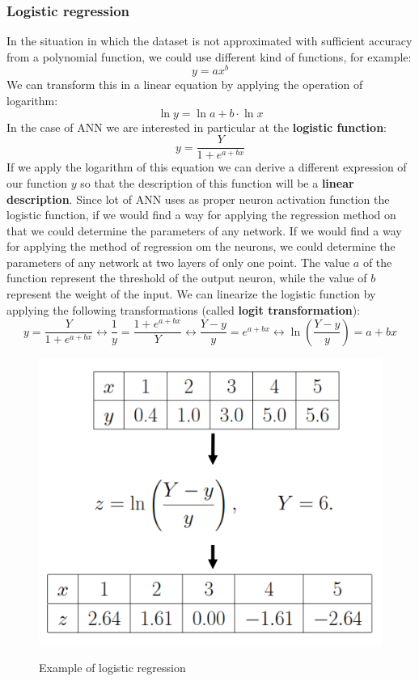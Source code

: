 \documentclass{article}
\begin{document}
\subsubsection{Logistic regression}
In the situation in which the dataset is not approximated with sufficient accuracy
from a polynomial function, we could use different kind of functions, for example:
$$y=ax^b$$
We can transform this in a linear equation by applying the operation of logarithm:
$$\ln{y}=\ln{a}+b\cdot\ln{x}$$
In the case of ANN we are interested in particular at the \textbf{logistic function}:
$$y=\frac{Y}{1 + e^{a+bx}}$$
If we apply the logarithm of this equation we can derive a different expression of our
function $y$ so that the description of this function will be a \textbf{linear description}.
\newline\newline
Since lot of ANN uses as proper neuron activation function the logistic function,
if we would find a way for applying the regression method on that we could determine
the parameters of any network.
\newline\newline
If we would find a way for applying the method of regression om the neurons, we could
determine the parameters of any network at two layers of only one point. The value $a$
of the function represent the threshold of the output neuron, while the value of $b$
represent the weight of the input. We can linearize the logistic function by applying
the following transformations (called \textbf{logit transformation}):
$$y=\frac{Y}{1+e^{a+bx}}\longleftrightarrow\frac{1}{y} = \frac{1+e^{a+bx}}{Y}
    \longleftrightarrow\frac{Y-y}{y}=e^{a+bx}\longleftrightarrow\ln{\left(\frac{Y-y}{y}\right)}=a+bx$$
\begin{figure}[H]
    \centering
    \includegraphics[scale=0.5]{images/logistic_regre_1.png}
    \label{fig:regr_1}
    \caption{Example of logistic regression}
\end{figure}
\end{document}
